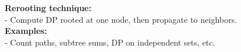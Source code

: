 \textbf{Rerooting technique:} \\[1mm]
- Compute DP rooted at one node, then propagate to neighbors. \\

\textbf{Examples:} \\[1mm]
- Count paths, subtree sums, DP on independent sets, etc. \\
